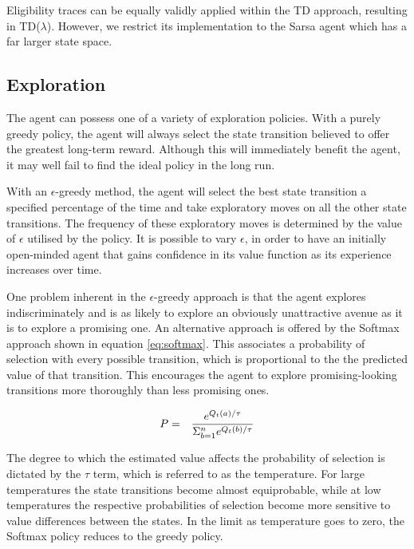 \documentclass{rucsthesis}
\begin{document}
Eligibility traces can be equally validly applied within the TD approach, resulting in TD($\lambda$). However, we restrict its implementation to the Sarsa agent which has a far larger state space.

\subsection{Exploration}

The agent can possess one of a variety of exploration policies. With a purely greedy policy, the agent will always select the state transition believed to offer the greatest long-term reward. Although this will immediately benefit the agent, it may well fail to find the ideal policy in the long run. 

With an $\epsilon$-greedy method, the agent will select the best state transition a specified percentage of the time and take exploratory moves on all the other state transitions. The frequency of these exploratory moves is determined by the value of $\epsilon$ utilised by the policy. It is possible to vary $\epsilon$, in order to have an initially open-minded agent that gains confidence in its value function as its experience increases over time. 

One problem inherent in the $\epsilon$-greedy approach is that the agent explores indiscriminately and is as likely to explore an obviously unattractive avenue as it is to explore a promising one. An alternative approach is offered by the Softmax approach shown in equation \ref{eq:softmax}. This associates a probability of selection with every possible transition, which is proportional to the the predicted value of that transition. This encourages the agent to explore promising-looking transitions more thoroughly than less promising ones.

\begin{eqnarray}
\centering
P & = & \frac{e^{Q_{t}(a)/\tau}}{\Sigma_{b=1}^{n}e^{Q_{t}(b)/\tau}} \label{eq:softmax}
\end{eqnarray}

The degree to which the estimated value affects the probability of selection is dictated by the $\tau$ term, which is referred to as the temperature. For large temperatures the state transitions become almost equiprobable, while at low temperatures the respective probabilities of selection become more sensitive to value differences between the states.  In the limit as temperature goes to zero, the Softmax policy reduces to the greedy policy.
\end{document}
